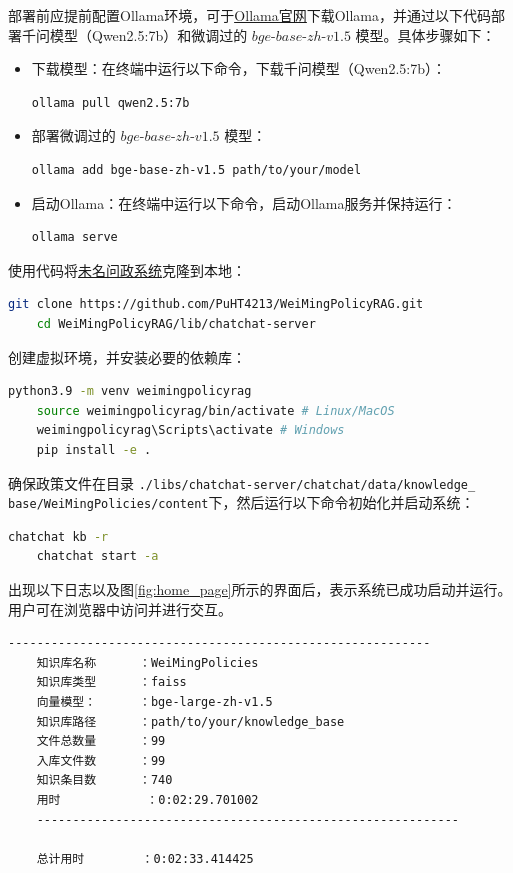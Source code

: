 \documentclass[12pt, a4paper]{ctexart}
\begin{document}
部署前应提前配置Ollama环境，可于\href{https://ollama.com/}{\underline{Ollama官网}}下载Ollama，并通过以下代码部署千问模型（Qwen2.5:7b）和微调过的 $bge\text{-}base\text{-}zh\text{-}v1.5$ 模型。具体步骤如下：
\begin{itemize}
    \item 下载模型：在终端中运行以下命令，下载千问模型（Qwen2.5:7b）：
    \begin{lstlisting}[language=bash]
        ollama pull qwen2.5:7b
    \end{lstlisting}
    \item 部署微调过的 $bge\text{-}base\text{-}zh\text{-}v1.5$ 模型：
    \begin{lstlisting}[language=bash]
        ollama add bge-base-zh-v1.5 path/to/your/model
    \end{lstlisting}
    \item 启动Ollama：在终端中运行以下命令，启动Ollama服务并保持运行：
    \begin{lstlisting}[language=bash]
        ollama serve
    \end{lstlisting}
\end{itemize}


使用代码将\href{https://github.com/PuHT4213/WeiMingPolicyRAG}{\underline{未名问政系统}}克隆到本地：
\begin{lstlisting}[language=bash]
    git clone https://github.com/PuHT4213/WeiMingPolicyRAG.git
    cd WeiMingPolicyRAG/lib/chatchat-server
\end{lstlisting}

创建虚拟环境，并安装必要的依赖库：
\begin{lstlisting}[language=bash]
    python3.9 -m venv weimingpolicyrag
    source weimingpolicyrag/bin/activate # Linux/MacOS
    weimingpolicyrag\Scripts\activate # Windows
    pip install -e .
\end{lstlisting}

确保政策文件在目录 \texttt{./libs/chatchat-server/chatchat/data/knowledge\_\\base/WeiMingPolicies/content}下，然后运行以下命令初始化并启动系统：
\begin{lstlisting}[language=bash]
    chatchat kb -r
    chatchat start -a
\end{lstlisting}

出现以下日志以及图\ref{fig:home_page}所示的界面后，表示系统已成功启动并运行。用户可在浏览器中访问并进行交互。
\begin{lstlisting}[language=bash]
    -----------------------------------------------------------
    知识库名称      ：WeiMingPolicies
    知识库类型      ：faiss
    向量模型：      ：bge-large-zh-v1.5
    知识库路径      ：path/to/your/knowledge_base
    文件总数量      ：99
    入库文件数      ：99
    知识条目数      ：740
    用时            ：0:02:29.701002
    -----------------------------------------------------------
    
    总计用时        ：0:02:33.414425
\end{lstlisting} 
\end{document}
